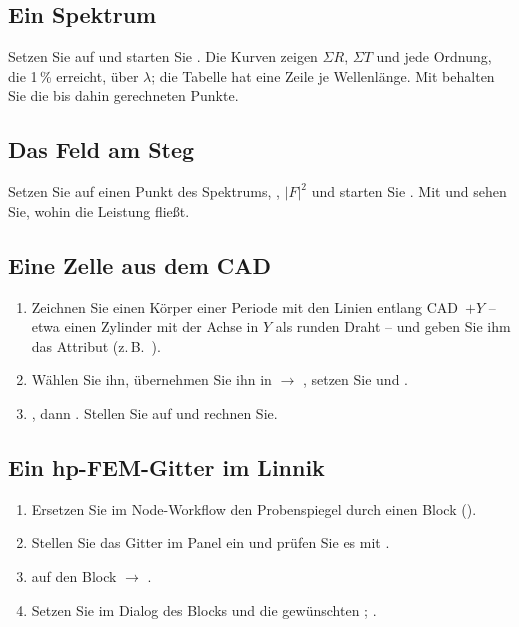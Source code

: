 \subsection{Ein Spektrum}

Setzen Sie  auf  und starten Sie . Die Kurven zeigen
$\Sigma R$, $\Sigma T$ und jede Ordnung, die 1\,\% erreicht, über $\lambda$; die Tabelle
 hat eine Zeile je Wellenlänge. Mit  behalten Sie die bis dahin
gerechneten Punkte.

\subsection{Das Feld am Steg}

Setzen Sie  auf einen Punkt des Spektrums,  ,
 $|F|^2$ und starten Sie . Mit   und 
 sehen Sie, wohin die Leistung fließt.

\subsection{Eine Zelle aus dem CAD}

\begin{enumerate}
  \item Zeichnen Sie einen Körper einer Periode mit den Linien entlang CAD~$+Y$ -- etwa einen
    Zylinder mit der Achse in $Y$ als runden Draht -- und geben Sie ihm das Attribut
     (z.\,B.\ ).
  \item Wählen Sie ihn, übernehmen Sie ihn in  $\to$ , setzen Sie
     und .
  \item {}, dann . Stellen Sie  auf 
    und rechnen Sie.
\end{enumerate}

\subsection{Ein hp-FEM-Gitter im Linnik}

\begin{enumerate}
  \item Ersetzen Sie im Node-Workflow den Probenspiegel durch einen Block 
    ().
  \item Stellen Sie das Gitter im Panel ein und prüfen Sie es mit .
  \item {} auf den Block $\to$ .
  \item Setzen Sie im Dialog des Blocks   und die gewünschten
    ; .
\end{enumerate}

